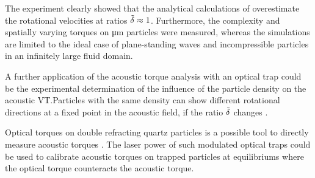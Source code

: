 The experiment clearly showed that the analytical calculations of 
\citeauthor{Lamprecht2015,Busse1981, Rudnick1977, Wang1989} \cite{Lamprecht2015, Busse1981, 
Rudnick1977, Wang1989}  overestimate the rotational velocities at ratios $\tilde{\delta} 
\approx 1$. Furthermore, the complexity and spatially varying torques on 
\si{\micro\meter} particles were measured, whereas the simulations are limited 
to the ideal case of plane-standing waves and incompressible particles in an 
infinitely large fluid domain. 

A further application of the acoustic torque analysis with an optical trap could 
be the experimental determination of the influence of the particle density on 
the acoustic VT.\@ Particles with the same density can show different rotational 
directions at a fixed point in the acoustic field, if the ratio $\tilde{\delta}$ 
changes \cite{Hahn2016}.

Optical torques on double refracting quartz particles is a possible tool to 
directly measure acoustic torques \cite{La2004}. The laser power of such 
modulated optical traps could be used to calibrate acoustic torques on trapped 
particles at equilibriums where the optical torque counteracts the acoustic 
torque. 


